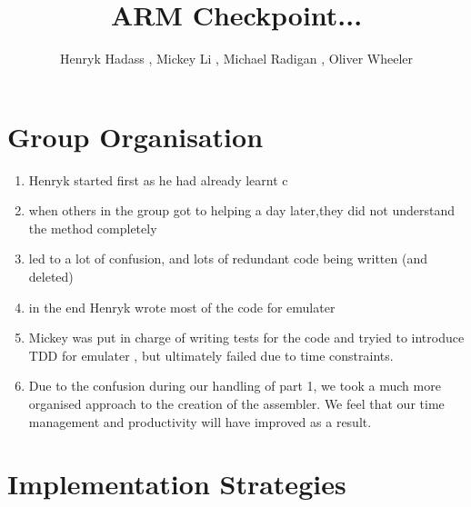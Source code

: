 \documentclass[11pt]{article}
\begin{document}
\title{ARM Checkpoint... }
\author{Henryk Hadass , Mickey Li , Michael Radigan , Oliver Wheeler}

\maketitle

\section{Group Organisation}

\begin{enumerate}

\item
Henryk started first as he had already learnt c

\item
when others in the group got to helping a day later,they did not understand the method completely

\item 
led to a lot of confusion, and lots of redundant code being written (and deleted)

\item
in the end Henryk wrote most of the code for emulater


\item
Mickey was put in charge of writing tests for the code and tryied to introduce TDD for emulater , but ultimately failed due to time constraints. 

\item
Due to the confusion during our handling of part 1, we took a much more organised approach to the creation of the assembler. We feel that our time management and productivity will have improved as a result. 

\end{enumerate}



\section{Implementation Strategies}
\end{document}
